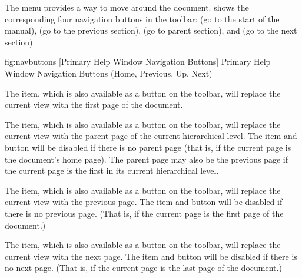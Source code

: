 
The  menu provides a way to move around
the document.
 shows the corresponding four navigation
buttons in the toolbar:  (go to the
start of the manual),  (go to the
previous section),  (go to parent
section), and  (go to the next
section).

\FloatFig
{fig:navbuttons}
{%
}
[Primary Help Window Navigation Buttons]
{Primary Help Window Navigation Buttons (Home, Previous, Up, Next)}


The  item, which is also available
as a button on the toolbar, will replace the current view with the
first page of the document.


The  item, which is also available
as a button on the toolbar, will replace the current view with the
parent page of the current hierarchical level. The item and button
will be disabled if there is no parent page (that is, if the current
page is the document's home page). The parent page may
also be the previous page if the current page is the first in its
current hierarchical level.


The  item, which is also available as
a button on the toolbar, will replace the current view with the
previous page. The item and button will be disabled if there is no
previous page. (That is, if the current page is the first
page of the document.)


The  item, which is also available as
a button on the toolbar, will replace the current view with the
next page. The item and button will be disabled if there is no
next page. (That is, if the current page is the last
page of the document.)


